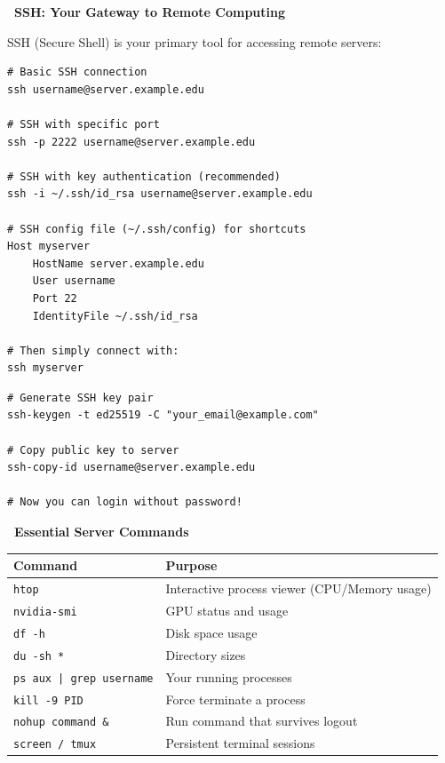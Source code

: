\documentclass[11pt,a4paper]{article}
\begin{document}
\textbf{\faKey~SSH: Your Gateway to Remote Computing}

SSH (Secure Shell) is your primary tool for accessing remote servers:

\begin{lstlisting}[style=bashstyle]
# Basic SSH connection
ssh username@server.example.edu

# SSH with specific port
ssh -p 2222 username@server.example.edu

# SSH with key authentication (recommended)
ssh -i ~/.ssh/id_rsa username@server.example.edu

# SSH config file (~/.ssh/config) for shortcuts
Host myserver
    HostName server.example.edu
    User username
    Port 22
    IdentityFile ~/.ssh/id_rsa

# Then simply connect with:
ssh myserver
\end{lstlisting}

\begin{tcolorbox}[colback=green!5,colframe=green!50,title={Pro Tip: SSH Key Setup}]
\begin{lstlisting}[style=bashstyle]
# Generate SSH key pair
ssh-keygen -t ed25519 -C "your_email@example.com"

# Copy public key to server
ssh-copy-id username@server.example.edu

# Now you can login without password!
\end{lstlisting}
\end{tcolorbox}

\textbf{\faTerminal~Essential Server Commands}

\begin{table}[H]
\centering
\begin{tabular}{ll}
\toprule
\textbf{Command} & \textbf{Purpose} \\
\midrule
\texttt{htop} & Interactive process viewer (CPU/Memory usage) \\
\texttt{nvidia-smi} & GPU status and usage \\
\texttt{df -h} & Disk space usage \\
\texttt{du -sh *} & Directory sizes \\
\texttt{ps aux | grep username} & Your running processes \\
\texttt{kill -9 PID} & Force terminate a process \\
\texttt{nohup command \&} & Run command that survives logout \\
\texttt{screen / tmux} & Persistent terminal sessions \\
\bottomrule
\end{tabular}
\end{table}
\end{document}
